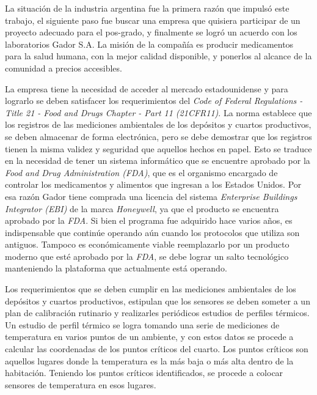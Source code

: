 La situación de la industria argentina fue la primera razón que impulsó este trabajo, el siguiente paso fue buscar una empresa que quisiera participar de un proyecto adecuado para el pos-grado, y finalmente se logró un acuerdo con los laboratorios Gador S.A. La misión de la compañía es producir medicamentos para la salud humana, con la mejor calidad disponible, y ponerlos al alcance de la comunidad a precios accesibles. \citep{WEBSITE:Gador}

La empresa tiene la necesidad de acceder al mercado estadounidense y para lograrlo se deben satisfacer los requerimientos del \emph{Code of Federal Regulations - Title 21 - Food and Drugs Chapter - Part 11 (21CFR11)}. La norma establece que los registros de las mediciones ambientales de los depósitos y cuartos productivos, se deben almacenar de forma electrónica, pero se debe demostrar que los registros tienen la misma validez y seguridad que aquellos hechos en papel. \citep{ARTICLE:21cfr11} Esto se traduce en la necesidad de tener un sistema informático que se encuentre aprobado por la \emph{Food and Drug Administration (FDA)}, que es el organismo encargado de controlar los medicamentos y alimentos que ingresan a los Estados Unidos.
Por esa razón Gador tiene comprada una licencia del sistema \emph{Enterprise Buildings Integrator (EBI)} de la marca \emph{Honeywell}, ya que el producto se encuentra aprobado por la \emph{FDA}. 
Si bien el programa fue adquirido hace varios años, es indispensable que continúe operando aún cuando los protocolos que utiliza son antiguos. Tampoco es económicamente viable reemplazarlo por un producto moderno que esté aprobado por la \emph{FDA}, se debe lograr un salto tecnológico manteniendo la plataforma que actualmente está operando.

Los requerimientos que se deben cumplir en las mediciones ambientales de los depósitos y cuartos productivos, estipulan que los sensores se deben someter a un plan de calibración rutinario y realizarles periódicos estudios de perfiles térmicos.
Un estudio de perfil térmico se logra tomando una serie de mediciones de temperatura en varios puntos de un ambiente, y con estos datos se procede a calcular las coordenadas de los puntos críticos del cuarto. \citep{ARTICLE:Temperature}
Los puntos críticos son aquellos lugares donde la temperatura es la más baja o más alta dentro de la habitación.
Teniendo los puntos críticos identificados, se procede a colocar sensores de temperatura en esos lugares.

